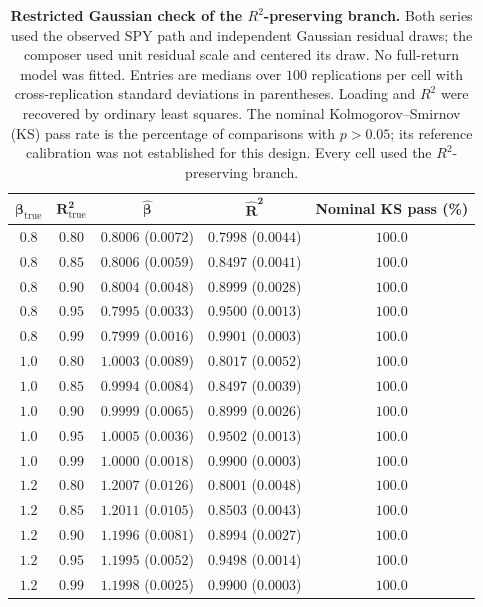 \begin{table}[H]
\centering
\caption{\textbf{Restricted Gaussian check of the $R^2$-preserving
    branch.} Both series used the observed SPY path and independent
    Gaussian residual draws; the composer used unit residual scale and
    centered its draw. No full-return model was fitted. Entries are
    medians over $100$ replications per cell with cross-replication
    standard deviations in parentheses. Loading and $R^2$ were recovered
    by ordinary least squares. The nominal Kolmogorov--Smirnov (KS) pass
    rate is the percentage of comparisons with $p>0.05$; its reference
    calibration was not established for this design. Every cell used
    the $R^2$-preserving branch.}
\label{tab:tracker_grid}
\small
\begin{tabular}{@{}ccccc@{}}
\toprule
$\boldsymbol{\beta_{\mathrm{true}}}$ &
$\boldsymbol{R^2_{\mathrm{true}}}$ &
$\boldsymbol{\hat\beta}$ & $\boldsymbol{\hat R^2}$ &
\textbf{Nominal KS pass (\%)} \\ \midrule
$0.8$ & $0.80$ & $0.8006$ ($0.0072$) & $0.7998$ ($0.0044$) & $100.0$ \\
$0.8$ & $0.85$ & $0.8006$ ($0.0059$) & $0.8497$ ($0.0041$) & $100.0$ \\
$0.8$ & $0.90$ & $0.8004$ ($0.0048$) & $0.8999$ ($0.0028$) & $100.0$ \\
$0.8$ & $0.95$ & $0.7995$ ($0.0033$) & $0.9500$ ($0.0013$) & $100.0$ \\
$0.8$ & $0.99$ & $0.7999$ ($0.0016$) & $0.9901$ ($0.0003$) & $100.0$ \\ \midrule
$1.0$ & $0.80$ & $1.0003$ ($0.0089$) & $0.8017$ ($0.0052$) & $100.0$ \\
$1.0$ & $0.85$ & $0.9994$ ($0.0084$) & $0.8497$ ($0.0039$) & $100.0$ \\
$1.0$ & $0.90$ & $0.9999$ ($0.0065$) & $0.8999$ ($0.0026$) & $100.0$ \\
$1.0$ & $0.95$ & $1.0005$ ($0.0036$) & $0.9502$ ($0.0013$) & $100.0$ \\
$1.0$ & $0.99$ & $1.0000$ ($0.0018$) & $0.9900$ ($0.0003$) & $100.0$ \\ \midrule
$1.2$ & $0.80$ & $1.2007$ ($0.0126$) & $0.8001$ ($0.0048$) & $100.0$ \\
$1.2$ & $0.85$ & $1.2011$ ($0.0105$) & $0.8503$ ($0.0043$) & $100.0$ \\
$1.2$ & $0.90$ & $1.1996$ ($0.0081$) & $0.8994$ ($0.0027$) & $100.0$ \\
$1.2$ & $0.95$ & $1.1995$ ($0.0052$) & $0.9498$ ($0.0014$) & $100.0$ \\
$1.2$ & $0.99$ & $1.1998$ ($0.0025$) & $0.9900$ ($0.0003$) & $100.0$ \\
\bottomrule
\end{tabular}
\end{table}

